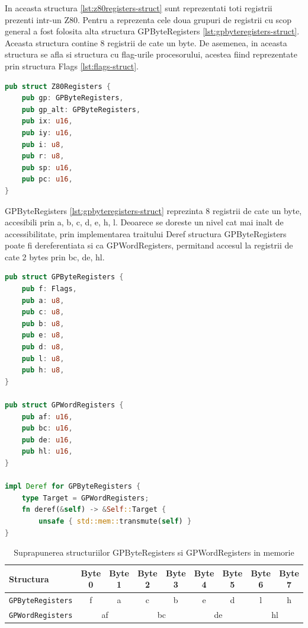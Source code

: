 \documentclass[titlepage,12pt]{article}
\DeclareRobustCommand{\code}[1]{{\ttfamily\small #1}}
\begin{document}
In aceasta structura \cref{lst:z80registers-struct} sunt reprezentati toti registrii prezenti intr-un Z80. Pentru a reprezenta cele doua grupuri de registrii cu scop general a fost folosita alta structura \code{GPByteRegisters} \cref{lst:gpbyteregisters-struct}. Aceasta structura contine 8 registrii de cate un byte. De asemenea, in aceasta structura se afla si structura cu flag-urile procesorului, acestea fiind reprezentate prin structura \code{Flags} \cref{lst:flags-struct}.

\begin{lstlisting}[language=Rust,caption={Structura Z80Registers},label={lst:z80registers-struct}]
pub struct Z80Registers {
    pub gp: GPByteRegisters,
    pub gp_alt: GPByteRegisters,
    pub ix: u16,
    pub iy: u16,
    pub i: u8,
    pub r: u8,
    pub sp: u16,
    pub pc: u16,
}
\end{lstlisting}

\code{GPByteRegisters} \cref{lst:gpbyteregisters-struct} reprezinta 8 registrii de cate un byte, accesibili prin \code{a}, \code{b}, \code{c}, \code{d}, \code{e}, \code{h}, \code{l}.
Deoarece se doreste un nivel cat mai inalt de accessibilitate, prin implementarea traitului \code{Deref} structura \code{GPByteRegisters} poate fi dereferentiata si ca \code{GPWordRegisters}, permitand accesul la registrii de cate 2 bytes prin \code{bc}, \code{de}, \code{hl}.

\begin{lstlisting}[language=Rust,caption={Structura GPByteRegisters},label={lst:gpbyteregisters-struct}]
pub struct GPByteRegisters {
    pub f: Flags,
    pub a: u8,
    pub c: u8,
    pub b: u8,
    pub e: u8,
    pub d: u8,
    pub l: u8,
    pub h: u8,
}

pub struct GPWordRegisters {
    pub af: u16,
    pub bc: u16,
    pub de: u16,
    pub hl: u16,
}

impl Deref for GPByteRegisters {
    type Target = GPWordRegisters;
    fn deref(&self) -> &Self::Target {
        unsafe { std::mem::transmute(self) }
}
\end{lstlisting}

\begin{table}[h!]
\centering
\begin{tabular}{|l|c|c|c|c|c|c|c|c|}
\hline
\textbf{Structura} & \textbf{Byte 0} & \textbf{Byte 1} & \textbf{Byte 2} & \textbf{Byte 3} & \textbf{Byte 4} & \textbf{Byte 5} & \textbf{Byte 6} & \textbf{Byte 7} \\
\hline
\texttt{GPByteRegisters} & f & a & c & b & e & d & l & h \\
\hline
\texttt{GPWordRegisters} & \multicolumn{2}{c|}{af} & \multicolumn{2}{c|}{bc} & \multicolumn{2}{c|}{de} & \multicolumn{2}{c|}{hl} \\
\hline
\end{tabular}
\caption{Suprapunerea structuriilor \code{GPByteRegisters} si \code{GPWordRegisters} in memorie}
\end{table}
\end{document}
